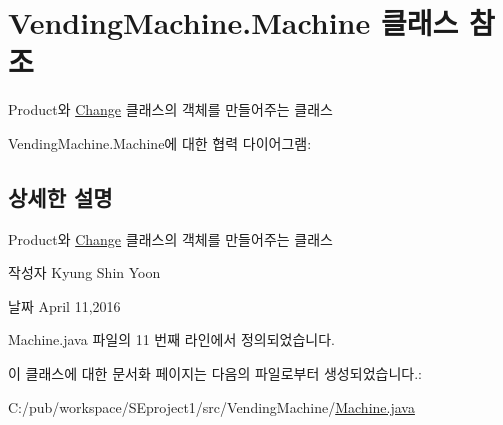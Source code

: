 \hypertarget{class_vending_machine_1_1_machine}{}\section{Vending\+Machine.\+Machine 클래스 참조}
\label{class_vending_machine_1_1_machine}


Product와 \hyperlink{class_vending_machine_1_1_change}{Change} 클래스의 객체를 만들어주는 클래스  




Vending\+Machine.\+Machine에 대한 협력 다이어그램\+:


\subsection{상세한 설명}
Product와 \hyperlink{class_vending_machine_1_1_change}{Change} 클래스의 객체를 만들어주는 클래스 

\begin{DoxyAuthor}{작성자}
Kyung Shin Yoon 
\end{DoxyAuthor}
\begin{DoxyDate}{날짜}
April 11,2016 
\end{DoxyDate}


Machine.\+java 파일의 11 번째 라인에서 정의되었습니다.



이 클래스에 대한 문서화 페이지는 다음의 파일로부터 생성되었습니다.\+:\begin{DoxyCompactItemize}
\item 
C\+:/pub/workspace/\+S\+Eproject1/src/\+Vending\+Machine/\hyperlink{_machine_8java}{Machine.\+java}\end{DoxyCompactItemize}
